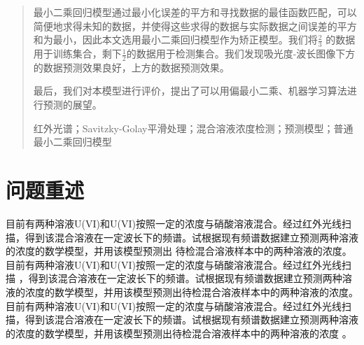 \documentclass[a4paper]{ctexart}
\begin{document}


\makecoverpage


\begin{titlepage}
    \makeabstractstart
    \begin{abstract}\abstractcontent
    最小二乘回归模型通过最小化误差的平方和寻找数据的最佳函数匹配，可以简便地求得未知的数据，并使得这些求得的数据与实际数据之间误差的平方和为最小，因此本文选用最小二乘回归模型作为矫正模型。我们将$\frac{2}{3}$ 的数据用于训练集合，剩下$\frac{1}{2}$的数据用于检测集合。我们发现吸光度-波长图像下方的数据预测效果良好，上方的数据预测效果。\par
    最后，我们对本模型进行评价，提出了可以用偏最小二乘、机器学习算法进行预测的展望。\par
    {}红外光谱；Savitzky-Golay平滑处理；混合溶液浓度检测；预测模型；普通最小二乘回归模型
    \end{abstract}
\end{titlepage}



\makecontent




\maketxtstart



\section{问题重述}
目前有两种溶液U(VI)和U(VI)按照一定的浓度与硝酸溶液混合。经过红外光线扫描，得到该混合溶液在一定波长下的频谱。试根据现有频谱数据建立预测两种溶液的浓度的数学模型，并用该模型预测出 \cite{hariharan2014simultaneous} 待检混合溶液样本中的两种溶液的浓度。
目前有两种溶液U(VI)和U(VI)按照一定的浓度与硝酸溶液混合。经过红外光线扫描 \cite{周222222}，得到该混合溶液在一定波长下的频谱。试根据现有频谱数据建立预测两种溶液的浓度的数学模型，并用该模型预测出待检混合溶液样本中的两种溶液的浓度。
目前有两种溶液U(VI)和U(VI)按照一定的浓度与硝酸溶液混合。经过红外光线扫描，得到该混合溶液在一定波长下的频谱。试根据现有频谱数据建立预测两种溶液的浓度的数学模型，并用该模型预测出待检混合溶液样本中的两种溶液的浓度 \cite{周2121222}。
\end{document}
